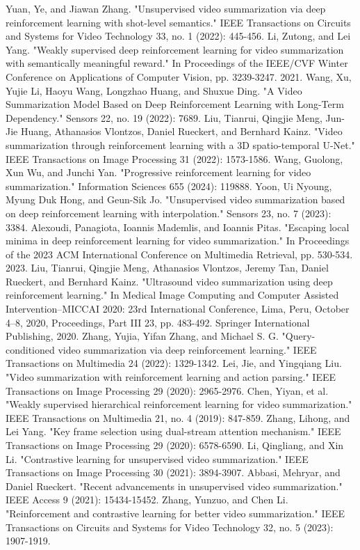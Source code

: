 \documentclass[conference]{IEEEtran}
\begin{document}
\begin{thebibliography}{00}
 Yuan, Ye, and Jiawan Zhang. "Unsupervised video summarization via deep reinforcement learning with shot-level semantics." IEEE Transactions on Circuits and Systems for Video Technology 33, no. 1 (2022): 445-456.
 Li, Zutong, and Lei Yang. "Weakly supervised deep reinforcement learning for video summarization with semantically meaningful reward." In Proceedings of the IEEE/CVF Winter Conference on Applications of Computer Vision, pp. 3239-3247. 2021.
 Wang, Xu, Yujie Li, Haoyu Wang, Longzhao Huang, and Shuxue Ding. "A Video Summarization Model Based on Deep Reinforcement Learning with Long-Term Dependency." Sensors 22, no. 19 (2022): 7689.
 Liu, Tianrui, Qingjie Meng, Jun-Jie Huang, Athanasios Vlontzos, Daniel Rueckert, and Bernhard Kainz. "Video summarization through reinforcement learning with a 3D spatio-temporal U-Net." IEEE Transactions on Image Processing 31 (2022): 1573-1586.
 Wang, Guolong, Xun Wu, and Junchi Yan. "Progressive reinforcement learning for video summarization." Information Sciences 655 (2024): 119888.
 Yoon, Ui Nyoung, Myung Duk Hong, and Geun-Sik Jo. "Unsupervised video summarization based on deep reinforcement learning with interpolation." Sensors 23, no. 7 (2023): 3384.
 Alexoudi, Panagiota, Ioannis Mademlis, and Ioannis Pitas. "Escaping local minima in deep reinforcement learning for video summarization." In Proceedings of the 2023 ACM International Conference on Multimedia Retrieval, pp. 530-534. 2023.
 Liu, Tianrui, Qingjie Meng, Athanasios Vlontzos, Jeremy Tan, Daniel Rueckert, and Bernhard Kainz. "Ultrasound video summarization using deep reinforcement learning." In Medical Image Computing and Computer Assisted Intervention–MICCAI 2020: 23rd International Conference, Lima, Peru, October 4–8, 2020, Proceedings, Part III 23, pp. 483-492. Springer International Publishing, 2020.
 Zhang, Yujia, Yifan Zhang, and Michael S. G. "Query-conditioned video summarization via deep reinforcement learning." IEEE Transactions on Multimedia 24 (2022): 1329-1342.
 Lei, Jie, and Yingqiang Liu. "Video summarization with reinforcement learning and action parsing." IEEE Transactions on Image Processing 29 (2020): 2965-2976.
 Chen, Yiyan, et al. "Weakly supervised hierarchical reinforcement learning for video summarization." IEEE Transactions on Multimedia 21, no. 4 (2019): 847-859.
 Zhang, Lihong, and Lei Yang. "Key frame selection using dual-stream attention mechanism." IEEE Transactions on Image Processing 29 (2020): 6578-6590.
 Li, Qingliang, and Xin Li. "Contrastive learning for unsupervised video summarization." IEEE Transactions on Image Processing 30 (2021): 3894-3907.
 Abbasi, Mehryar, and Daniel Rueckert. "Recent advancements in unsupervised video summarization." IEEE Access 9 (2021): 15434-15452.
 Zhang, Yunzuo, and Chen Li. "Reinforcement and contrastive learning for better video summarization." IEEE Transactions on Circuits and Systems for Video Technology 32, no. 5 (2023): 1907-1919.
\end{thebibliography}
\end{document}
